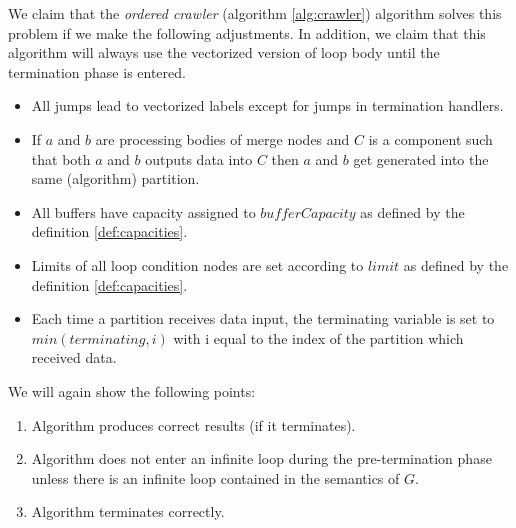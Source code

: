 %
%
%
%
%


We claim that the \emph{ordered crawler} (algorithm \ref{alg:crawler}) algorithm solves this problem if we make the following adjustments. In addition, we claim that this algorithm will always use the vectorized version of loop body until the termination phase is entered.
 \begin{itemize}
   \item All jumps lead to vectorized labels except for jumps in termination handlers.
   \item If $a$ and $b$ are processing bodies of merge nodes and $C$ is a component such that both $a$ and $b$ outputs data into $C$ then $a$ and $b$ get generated into the same (algorithm) partition.
   \item All buffers have capacity assigned to $bufferCapacity$ as defined by the definition \ref{def:capacities}.
   \item Limits of all loop condition nodes are set according to $limit$ as defined by the definition \ref{def:capacities}.
   \item Each time a partition receives data input, the terminating variable is set to $min(terminating,i)$ with i equal to the index of the partition which received data.
 \end{itemize}
We will again show the following points:
\begin{enumerate}
  \item Algorithm produces correct results (if it terminates).
  \item Algorithm does not enter an infinite loop during the pre-termination phase unless there is an infinite loop contained in the semantics of $G$.
  \item Algorithm terminates correctly.
\end{enumerate}
